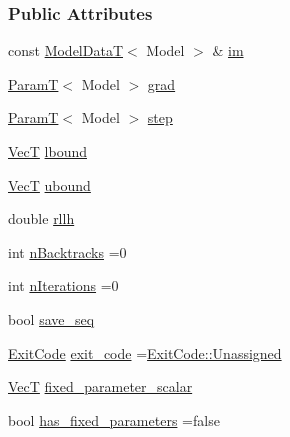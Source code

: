\subsubsection*{Public Attributes}
\begin{DoxyCompactItemize}
\item 
const \hyperlink{namespacemappel_a97f050df953605381ae9c901c3b125f1}{Model\+DataT}$<$ Model $>$ \& \hyperlink{classmappel_1_1IterativeMaximizer_1_1MaximizerData_afcee3fa283be1a9ba1d197ed777d447c}{im}
\item 
\hyperlink{namespacemappel_a667925cb0d6c0e49f2f035cc5a9a6857}{ParamT}$<$ Model $>$ \hyperlink{classmappel_1_1IterativeMaximizer_1_1MaximizerData_a3125e5d8ae4e2d4c4969ccb0187903fb}{grad}
\item 
\hyperlink{namespacemappel_a667925cb0d6c0e49f2f035cc5a9a6857}{ParamT}$<$ Model $>$ \hyperlink{classmappel_1_1IterativeMaximizer_1_1MaximizerData_af592d029ed46c5ec9bedd2291db12920}{step}
\item 
\hyperlink{namespacemappel_a2225ad69f358daa3f4f99282a35b9a3a}{VecT} \hyperlink{classmappel_1_1IterativeMaximizer_1_1MaximizerData_aead80fc0e12236ca355849ad36749094}{lbound}
\item 
\hyperlink{namespacemappel_a2225ad69f358daa3f4f99282a35b9a3a}{VecT} \hyperlink{classmappel_1_1IterativeMaximizer_1_1MaximizerData_a222f9843c94b82c5ee9ad7c8af04ab52}{ubound}
\item 
double \hyperlink{classmappel_1_1IterativeMaximizer_1_1MaximizerData_a224b29201511a2ab8ca86535631c41ef}{rllh}
\item 
int \hyperlink{classmappel_1_1IterativeMaximizer_1_1MaximizerData_a7caa78309de84e0ab4815fc00fbd6cf5}{n\+Backtracks} =0
\item 
int \hyperlink{classmappel_1_1IterativeMaximizer_1_1MaximizerData_a7ee453c4ba6108b9c0cbce345b0ee4da}{n\+Iterations} =0
\item 
bool \hyperlink{classmappel_1_1IterativeMaximizer_1_1MaximizerData_af13babebeb16147883db7af0b4875b53}{save\+\_\+seq}
\item 
\hyperlink{classmappel_1_1IterativeMaximizer_a5dc8660cf33abf3f3a576f051466521c}{Exit\+Code} \hyperlink{classmappel_1_1IterativeMaximizer_1_1MaximizerData_abf4f25be02f47143a077c7ac6419aed6}{exit\+\_\+code} =\hyperlink{classmappel_1_1IterativeMaximizer_a5dc8660cf33abf3f3a576f051466521ca3476bf9c3af766198bfbd4f065a51e69}{Exit\+Code\+::\+Unassigned}
\item 
\hyperlink{namespacemappel_a2225ad69f358daa3f4f99282a35b9a3a}{VecT} \hyperlink{classmappel_1_1IterativeMaximizer_1_1MaximizerData_af078e8d5506273857fd7c2ffad69f8da}{fixed\+\_\+parameter\+\_\+scalar}
\item 
bool \hyperlink{classmappel_1_1IterativeMaximizer_1_1MaximizerData_a9f1c22b2c3065f92244230a74fc948aa}{has\+\_\+fixed\+\_\+parameters} =false
\end{DoxyCompactItemize}
